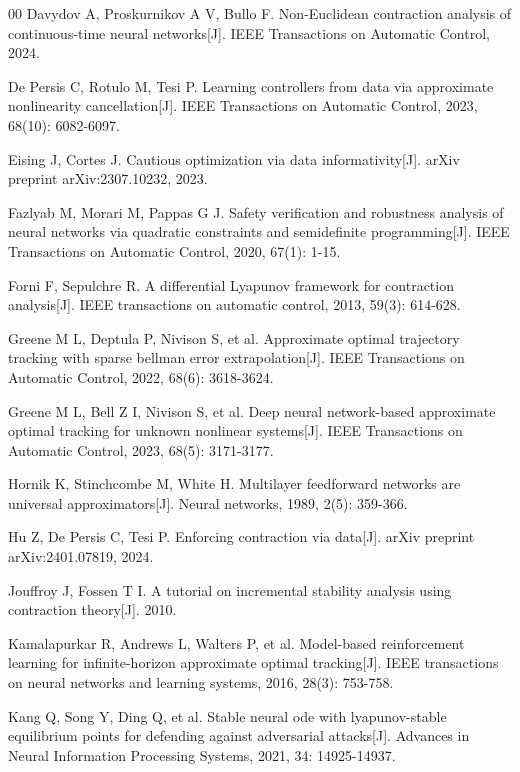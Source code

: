 \documentclass[journal,twoside,web]{ieeecolor}
\begin{document}
\begin{thebibliography}{00}
 Davydov A, Proskurnikov A V, Bullo F. Non-Euclidean contraction analysis of continuous-time neural networks[J]. IEEE Transactions on Automatic Control, 2024.

 De Persis C, Rotulo M, Tesi P. Learning controllers from data via approximate nonlinearity cancellation[J]. IEEE Transactions on Automatic Control, 2023, 68(10): 6082-6097.

 Eising J, Cortes J. Cautious optimization via data informativity[J]. arXiv preprint arXiv:2307.10232, 2023.

 Fazlyab M, Morari M, Pappas G J. Safety verification and robustness analysis of neural networks via quadratic constraints and semidefinite programming[J]. IEEE Transactions on Automatic Control, 2020, 67(1): 1-15.

 Forni F, Sepulchre R. A differential Lyapunov framework for contraction analysis[J]. IEEE transactions on automatic control, 2013, 59(3): 614-628.

 Greene M L, Deptula P, Nivison S, et al. Approximate optimal trajectory tracking with sparse bellman error extrapolation[J]. IEEE Transactions on Automatic Control, 2022, 68(6): 3618-3624.

 Greene M L, Bell Z I, Nivison S, et al. Deep neural network-based approximate optimal tracking for unknown nonlinear systems[J]. IEEE Transactions on Automatic Control, 2023, 68(5): 3171-3177.

 Hornik K, Stinchcombe M, White H. Multilayer feedforward networks are universal approximators[J]. Neural networks, 1989, 2(5): 359-366.

 Hu Z, De Persis C, Tesi P. Enforcing contraction via data[J]. arXiv preprint arXiv:2401.07819, 2024.

 Jouffroy J, Fossen T I. A tutorial on incremental stability analysis using contraction theory[J]. 2010.

 Kamalapurkar R, Andrews L, Walters P, et al. Model-based reinforcement learning for infinite-horizon approximate optimal tracking[J]. IEEE transactions on neural networks and learning systems, 2016, 28(3): 753-758.

 Kang Q, Song Y, Ding Q, et al. Stable neural ode with lyapunov-stable equilibrium points for defending against adversarial attacks[J]. Advances in Neural Information Processing Systems, 2021, 34: 14925-14937.


\end{thebibliography}
\end{document}
